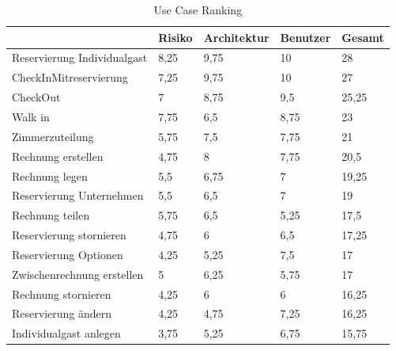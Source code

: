 \documentclass[a4paper,12pt,twoside]{scrreprt}
\begin{document}
        \begin{longtable}{|l|l|l|l|l|}
            \caption{Use Case Ranking}
            \hline
                                         & Risiko & Architektur & Benutzer & Gesamt \\ \hline
            Reservierung Individualgast  & 8,25              & 9,75                   & 10                  & 28     \\
            CheckInMitreservierung       & 7,25              & 9,75                   & 10                  & 27     \\
            CheckOut                     & 7                 & 8,75                   & 9,5                 & 25,25  \\
            Walk in                      & 7,75              & 6,5                    & 8,75                & 23     \\
            Zimmerzuteilung              & 5,75              & 7,5                    & 7,75                & 21     \\
            Rechnung erstellen           & 4,75              & 8                      & 7,75                & 20,5   \\
            Rechnung legen               & 5,5               & 6,75                   & 7                   & 19,25  \\
            Reservierung Unternehmen     & 5,5               & 6,5                    & 7                   & 19     \\
            Rechnung teilen              & 5,75              & 6,5                    & 5,25                & 17,5   \\
            Reservierung stornieren      & 4,75              & 6                      & 6,5                 & 17,25  \\
            Reservierung Optionen        & 4,25              & 5,25                   & 7,5                 & 17     \\
            Zwischenrechnung erstellen   & 5                 & 6,25                   & 5,75                & 17     \\
            Rechnung stornieren          & 4,25              & 6                      & 6                   & 16,25  \\
            Reservierung ändern          & 4,25              & 4,75                   & 7,25                & 16,25  \\
            Individualgast anlegen       & 3,75              & 5,25                   & 6,75                & 15,75  \\

\end{longtable}
\end{document}
